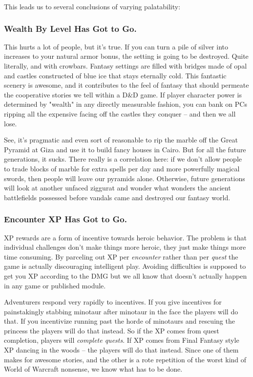 This leads us to several conclusions of varying palatability:

\subsubsection{Wealth By Level Has Got to Go.}

This hurts a lot of people, but it's true. If you can turn a pile of silver into increases to your natural armor bonus, the setting is going to be destroyed. Quite literally, and with crowbars. Fantasy settings are filled with bridges made of opal and castles constructed of blue ice that stays eternally cold. This fantastic scenery is awesome, and it contributes to the feel of fantasy that should permeate the cooperative stories we tell within a D\&D game. If player character power is determined by "wealth" in any directly measurable fashion, you can bank on PCs ripping all the expensive facing off the castles they conquer -- and then we all lose.

See, it's pragmatic and even sort of reasonable to rip the marble off the Great Pyramid at Giza and use it to build fancy houses in Cairo. But for all the future generations, it sucks. There really is a correlation here: if we don't allow people to trade blocks of marble for extra spells per day and more powerfully magical swords, then people will leave our pyramids alone. Otherwise, future generations will look at another unfaced ziggurat and wonder what wonders the ancient battlefields possessed before vandals came and destroyed our fantasy world.

\subsubsection{Encounter XP Has Got to Go.}

XP rewards are a form of incentive towards heroic behavior. The problem is that individual challenges don't make things more heroic, they just make things more time consuming. By parceling out XP per \textit{encounter} rather than per \textit{quest} the game is actually discouraging intelligent play. Avoiding difficulties is supposed to get you XP according to the DMG but we all know that doesn't actually happen in any game or published module.

Adventurers respond very rapidly to incentives. If you give incentives for painstakingly stabbing minotaur after minotaur in the face the players will do that. If you incentivize running past the horde of minotaurs and rescuing the princess the players will do that instead. So if the XP comes from quest completion, players will \textit{complete quests}. If XP comes from Final Fantasy style XP dancing in the woods -- the players will do that instead. Since one of them makes for awesome stories, and the other is a rote repetition of the worst kind of World of Warcraft nonsense, we know what has to be done.

